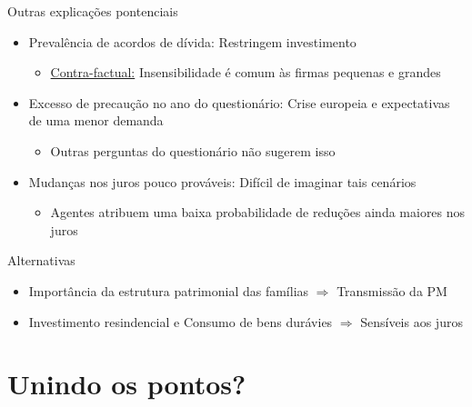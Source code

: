\documentclass[presentation]{beamer}
\begin{document}
\begin{frame}[label={sec:org512e393}]{Outras explicações pontenciais}
\begin{itemize}
\item \alert{Prevalência de acordos de dívida:} Restringem investimento
\begin{itemize}
\item \uline{Contra-factual:} Insensibilidade é comum às firmas pequenas e grandes
\end{itemize}
\item \alert{Excesso de precaução no ano do questionário:} Crise europeia e expectativas de uma menor demanda
\begin{itemize}
\item Outras perguntas do questionário não sugerem isso
\end{itemize}
\item \alert{Mudanças nos juros pouco prováveis:} Difícil de imaginar tais cenários
\begin{itemize}
\item Agentes atribuem uma baixa probabilidade de reduções ainda maiores nos juros
\end{itemize}
\end{itemize}

\begin{block}{Alternativas}
\begin{itemize}
\item Importância da estrutura patrimonial das \alert{famílias} \(\Rightarrow\) Transmissão da PM
\item Investimento resindencial e Consumo de bens durávies \(\Rightarrow\) Sensíveis aos juros
\end{itemize}
\end{block}
\end{frame}

\section{Unindo os pontos?}
\label{sec:org274e241}
\end{document}
